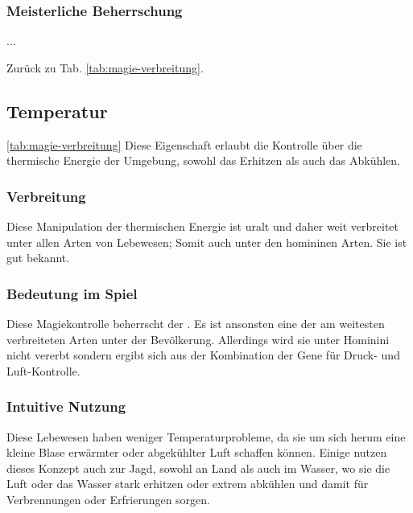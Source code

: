 \subsubsection{Meisterliche Beherrschung} 
\begin{outline}
	\1 ...
\end{outline}
Zurück zu Tab. \ref{tab:magie-verbreitung}.



\subsection{Temperatur}\label{sec:temperaturmagie} \ref{tab:magie-verbreitung}
Diese Eigenschaft erlaubt die Kontrolle über die thermische Energie der Umgebung, sowohl das Erhitzen als auch das Abkühlen.

\subsubsection{Verbreitung}
Diese Manipulation der thermischen Energie ist uralt und daher weit verbreitet unter allen Arten von Lebewesen; Somit auch unter den homininen Arten. Sie ist gut bekannt.

\subsubsection{Bedeutung im Spiel}
Diese Magiekontrolle beherrscht der . Es ist ansonsten eine der am weitesten verbreiteten Arten unter der Bevölkerung. Allerdings wird sie unter Hominini nicht vererbt sondern ergibt sich aus der Kombination der Gene für Druck- und Luft-Kontrolle.

\subsubsection{Intuitive Nutzung}
Diese Lebewesen haben weniger Temperaturprobleme, da sie um sich herum eine kleine Blase erwärmter oder abgekühlter Luft schaffen können. Einige nutzen dieses Konzept auch zur Jagd, sowohl an Land als auch im Wasser, wo sie die Luft oder das Wasser stark erhitzen oder extrem abkühlen und damit für Verbrennungen oder Erfrierungen sorgen.


